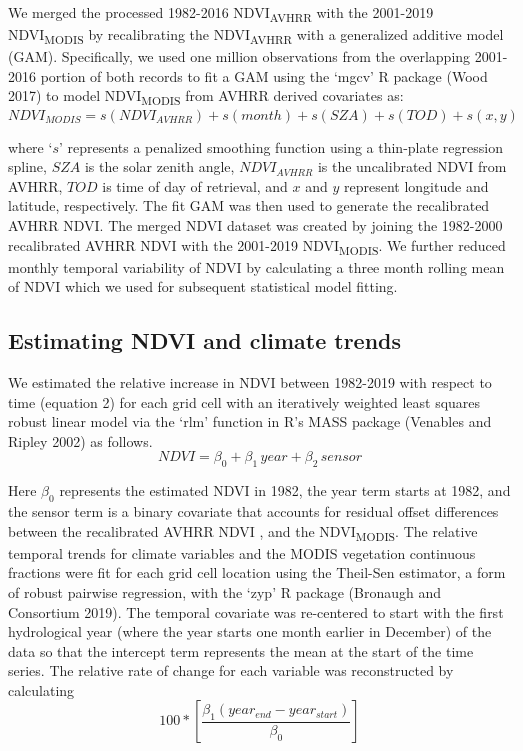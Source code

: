 \documentclass[
]{article}
\begin{document}
We merged the processed 1982-2016 NDVI\textsubscript{AVHRR} with the
2001-2019 NDVI\textsubscript{MODIS} by recalibrating the
NDVI\textsubscript{AVHRR} with a generalized additive model (GAM).
Specifically, we used one million observations from the overlapping
2001-2016 portion of both records to fit a GAM using the `mgcv' R
package (Wood 2017) to model NDVI\textsubscript{MODIS} from AVHRR
derived covariates as: \begin{equation}
NDVI_{MODIS} = s(NDVI_{AVHRR})+s(month) + s(SZA) + s(TOD) + s(x,y)
\end{equation}

where `\(s\)' represents a penalized smoothing function using a
thin-plate regression spline, \(SZA\) is the solar zenith angle,
\(NDVI_{AVHRR}\) is the uncalibrated NDVI from AVHRR, \(TOD\) is time of
day of retrieval, and \(x\) and \(y\) represent longitude and latitude,
respectively. The fit GAM was then used to generate the recalibrated
AVHRR NDVI. The merged NDVI dataset was created by joining the 1982-2000
recalibrated AVHRR NDVI with the 2001-2019 NDVI\textsubscript{MODIS}. We
further reduced monthly temporal variability of NDVI by calculating a
three month rolling mean of NDVI which we used for subsequent
statistical model fitting.

\hypertarget{estimating-ndvi-and-climate-trends}{%
\subsection{Estimating NDVI and climate
trends}\label{estimating-ndvi-and-climate-trends}}

We estimated the relative increase in NDVI between 1982-2019 with
respect to time (equation 2) for each grid cell with an iteratively
weighted least squares robust linear model via the `rlm' function in R's
MASS package (Venables and Ripley 2002) as follows. \begin{equation}
NDVI=\beta_0+ \beta_1\,year+\beta_2\,sensor
\end{equation}

Here \(\beta_0\) represents the estimated NDVI in 1982, the year term
starts at 1982, and the sensor term is a binary covariate that accounts
for residual offset differences between the recalibrated AVHRR NDVI ,
and the NDVI\textsubscript{MODIS}. The relative temporal trends for
climate variables and the MODIS vegetation continuous fractions were fit
for each grid cell location using the Theil-Sen estimator, a form of
robust pairwise regression, with the `zyp' R package (Bronaugh and
Consortium 2019). The temporal covariate was re-centered to start with
the first hydrological year (where the year starts one month earlier in
December) of the data so that the intercept term represents the mean at
the start of the time series. The relative rate of change for each
variable was reconstructed by calculating \begin{equation}
100*[\frac{\beta_1(year_{end}-year_{start})}{\beta_0}]
\end{equation}
\end{document}
